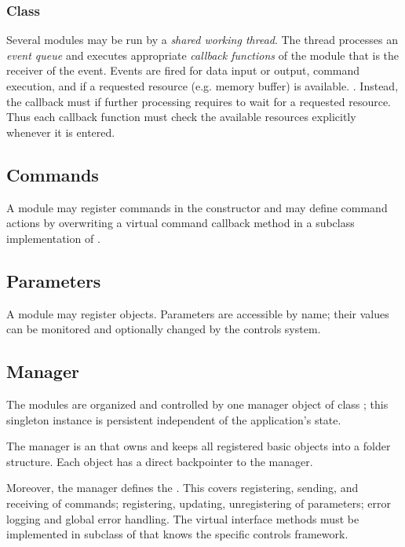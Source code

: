 \subsubsection{Class }
 Several modules may be run by a {\sl shared working thread}. 
The thread processes an  {\sl event queue} and executes 
appropriate  {\sl callback functions} 
of the module that is the receiver of the event. Events are fired for data input 
or output, command execution, and if a requested resource (e.g. memory buffer) 
is available. . 
Instead, the callback must  if further processing requires 
to wait for a requested resource. Thus each callback function must check the 
available resources explicitly whenever it is entered.
           
\subsection{Commands}
A module may register commands in the constructor and may define 
command actions by overwriting a virtual command callback method in a 
subclass implementation of .

\subsection{Parameters}
A module may register   objects. Parameters are accessible by name; their values can be monitored and optionally changed by 
the controls system. 

\subsection{Manager}
The modules are organized and controlled by one manager object of class 
;
this singleton instance is persistent independent of the application's state.

The manager is an  that owns and keeps all 
registered basic objects into a folder structure. Each object 
has a direct backpointer to the manager. 

Moreover, the manager defines the . 
This covers registering, sending, and receiving of commands; registering, 
updating, unregistering of parameters; error logging and global error handling. 
The virtual interface methods must be implemented in subclass of  that 
knows the specific controls framework.

